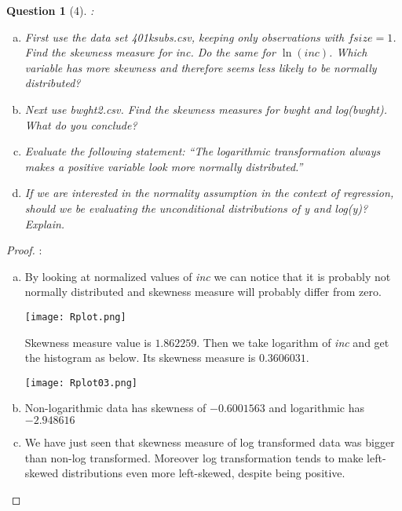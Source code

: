 \documentclass[12pt,reqno]{amsart}
\theoremstyle{plain}
\newtheorem*{theorem*}{Question}
\begin{document}
\begin{theorem*}[4]
    \normalfont
    :
    \begin{enumerate}[(a)]
        \item First use the data set \textit{401ksubs.csv}, keeping only observations with
              $ fsize = 1 $. Find the skewness measure for \textit{inc}. Do the same for $ \ln(inc) $.
              Which variable has more skewness and therefore seems less likely to be normally distributed?
        \item Next use \textit{bwght2.csv}. Find the skewness measures for \textit{bwght} and
              log(\textit{bwght}). What do you conclude?
        \item Evaluate the following statement: “The logarithmic transformation always makes a
              positive variable look more normally distributed.”
        \item If we are interested in the normality assumption in the context of regression, should
              we be evaluating the unconditional distributions of y and log(\textit{y})? Explain.
    \end{enumerate}
\end{theorem*}
\begin{proof}:
    \begin{enumerate}[(a)]
        \item By looking at normalized values of \textit{inc} we can notice that it is probably not
              normally distributed and skewness measure will probably differ from zero.
              \begin{figure*}[!hbtp]
                  \texttt{[image: Rplot.png]}
              \end{figure*}
              Skewness measure value is $ 1.862259 $.
              Then we take logarithm of \textit{inc} and get the histogram as below. Its skewness measure is
              $ 0.3606031 $.
              \begin{figure*}[!hbtp]
                  \centering
                  \texttt{[image: Rplot03.png]}
              \end{figure*}
        \item Non-logarithmic data has skewness of $ -0.6001563 $ and logarithmic has $ -2.948616 $
        \item We have just seen that skewness measure of log transformed data was bigger than non-log
              transformed. Moreover log transformation tends to make left-skewed distributions even more
              left-skewed, despite being positive.
    \end{enumerate}
\end{proof}
\end{document}
